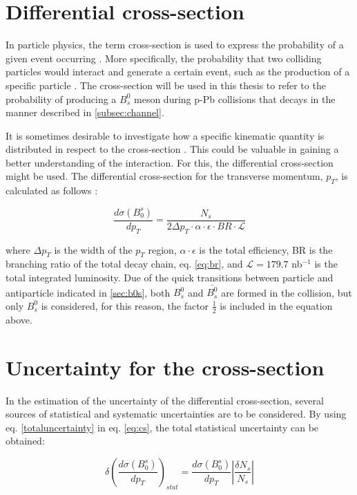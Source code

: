 \section{Differential cross-section}

In particle physics, the term cross-section is used to express the probability of a given event occurring \cite{thomson2013modern}. More specifically, the probability that two colliding particles would interact and generate a certain event, such as the production of a specific particle \cite{pivarski2013}. The cross-section will be used in this thesis to refer to the probability of producing a $B^0_s$ meson during p-Pb collisions that decays in the manner described in \ref{subsec:channel}.

It is sometimes desirable to investigate how a specific kinematic quantity is distributed in respect to the cross-section \cite{thomson2013modern}. This could be valuable in gaining a better understanding of the interaction. For this, the differential cross-section might be used. The differential cross-section for the transverse momentum, $p_T$, is calculated as follows \cite{abe1995measurement}: 

\begin{equation}
	\label{eq:cs}
\frac{d \sigma(B_0^s)}{dp_T} = \frac{N_s}{2 \Delta p_T \cdot \alpha \cdot \epsilon \cdot BR \cdot \mathcal{L}}
\end{equation}

where $\Delta p_T$ is the width of the $p_T$ region, $\alpha \cdot \epsilon$ is the total efficiency, BR is the branching ratio of the total decay chain, eq. \ref{eq:br}, and $\mathcal{L} = 179.7$ nb$^{-1}$  is the total integrated luminosity. Due of the quick transitions between particle and antiparticle indicated in \ref{sec:b0s}, both $B^0_s$ and $\bar{B^0_s}$ are formed in the collision, but only $B^0_s$ is considered, for this reason, the factor $\frac{1}{2}$ is included in the equation above.

\section{Uncertainty for the cross-section}

In the estimation of the uncertainty of the differential cross-section, several sources of statistical and systematic uncertainties are to be considered. By using eq. \ref{totaluncertainty} in eq. \ref{eq:cs}, the total statistical uncertainty can be obtained:

\begin{equation}
	\delta \left(\frac{d\sigma(B_0^s)}{dp_T} \right)_{stat} 
 =\frac{d \sigma(B_0^s)}{dp_T}\left| \frac{\delta N_s}{N_s}\right|
 \end{equation}

